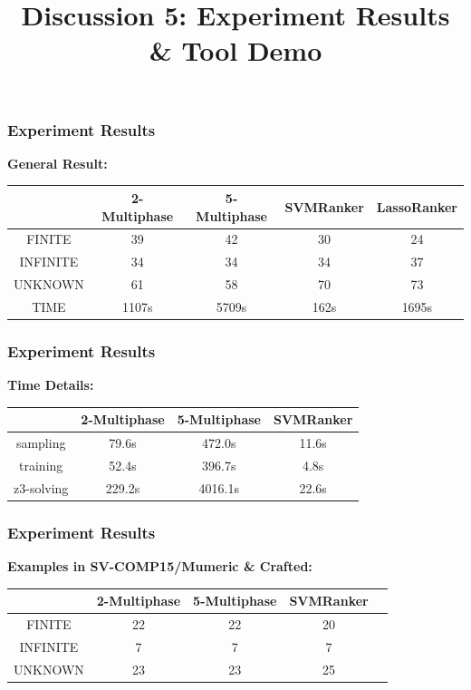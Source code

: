 \documentclass[10pt]{beamer}
\title{Discussion 5: Experiment Results \& Tool Demo}
\begin{document}
\maketitle
\begin{frame}\frametitle{Experiment Results}
\textbf{General Result: }
\begin{center}
\begin{tabular}{|c|c|c|c|c|}
\hline
& 2-Multiphase& 5-Multiphase & SVMRanker & LassoRanker\\
\hline 
FINITE & 39 & 42&30 & 24\\
\hline 

INFINITE & 34& 34&34 & 37\\
\hline

UNKNOWN & 61& 58&70 & 73\\
\hline
TIME &1107s& 5709s& 162s& 1695s\\
\hline

\end{tabular}
\end{center}


\end{frame}


\begin{frame}\frametitle{Experiment Results}
\textbf{Time Details:}

\begin{center}
\begin{tabular}{|c|c|c|c|}
\hline
& 2-Multiphase& 5-Multiphase & SVMRanker\\
\hline 
sampling &79.6s & 472.0s & 11.6s \\
\hline
training & 52.4s & 396.7s& 4.8s\\
\hline 
z3-solving & 229.2s& 4016.1s& 22.6s\\
\hline
\end{tabular}
\end{center}

\end{frame}

\begin{frame}\frametitle{Experiment Results}
\textbf{Examples in SV-COMP15/Mumeric \& Crafted:}

\begin{center}
\begin{tabular}{|c|c|c|c|c|}
\hline
& 2-Multiphase& 5-Multiphase & SVMRanker\\
\hline 
FINITE & 22 & 22& 20\\
\hline 

INFINITE & 7& 7& 7\\
\hline

UNKNOWN & 23& 23& 25\\
\hline

\end{tabular}
\end{center}

\end{frame}
\end{document}
